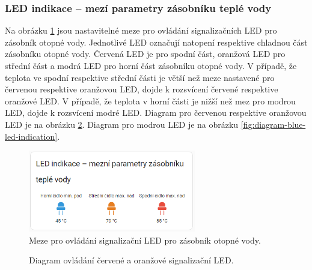 \begin{Czech}
\subsubsection{LED indikace – mezí parametry zásobníku teplé vody}
\end{Czech}
\label{sec:led-indication}

\begin{Czech}
Na obrázku \ref{fig:led-indication} jsou nastavitelné meze pro ovládání signalizačních LED pro zásobník otopné vody. Jednotlivé LED označují natopení respektive chladnou část zásobníku otopné vody. Červená LED je pro spodní část, oranžová LED pro střední část a modrá LED pro horní část zásobníku otopné vody. V případě, že teplota ve spodní respektive střední části je větší než meze nastavené pro červenou respektive oranžovou LED, dojde k rozsvícení červené respektive oranžové LED. V případě, že teplota v horní části je nižší než mez pro modrou LED, dojde k rozsvícení modré LED. Diagram pro červenou respektive oranžovou LED je na obrázku \ref{fig:diagram-red-orange-led-indication}. Diagram pro modrou LED je na obrázku \ref{fig:diagram-blue-led-indication}.
\end{Czech}

\begin{Czech}
\begin{figure}[H]
    \centering
    \includegraphics[width=0.65\textwidth]{pictures/czech/software/led-indication.png}
    \caption{Meze pro ovládání signalizační LED pro zásobník otopné vody.}
    \label{fig:led-indication}
\end{figure}
\end{Czech}

\begin{Czech}
\begin{figure}[H]
    \centering
    \def\svgwidth{1\columnwidth}
    \graphicspath{{pictures/czech/software/svg/}}
    
    \caption{Diagram ovládání červené a oranžové signalizační LED.}
    \label{fig:diagram-red-orange-led-indication}
\end{figure}
\end{Czech}

